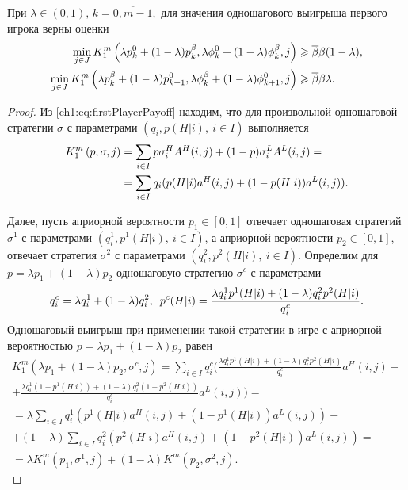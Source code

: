 {\begin{proposition}
  \label{ch1:prop:first:combination:step}
  При $\lambda \in (0, 1), \, k = \overline{0, m-1},$ для значения одношагового выигрыша первого игрока верны оценки
  \begin{align*}
    \min_{j \in J}
    \firstPlayerPayoff{1}{%
    \lambda \pEven + (1-\lambda) \pOdd}{%
    \lambda \fEven + (1-\lambda) \fOdd}{%
    j}
    &\geq \DCo \Co (1-\lambda), \\
    \min_{j \in J}
    \firstPlayerPayoff{1}{%
    \lambda \pOdd + (1-\lambda) \pEven[k+1]}{%
    \lambda \fOdd + (1-\lambda) \fEven[k+1]}{%
    j}
    &\geq \DCo \Co \lambda.
  \end{align*}
\end{proposition}
\begin{proof}
  Из \eqref{ch1:eq:firstPlayerPayoff} находим, что для произвольной одношаговой стратегии $\sigma$ с параметрами $(q_i, p(H|i),\ i \in I)$ выполняется
  \begin{align*}
    K_{1}^m\left({p}, {\sigma}, {j}\right) 
    &= \sum_{i \in I} p \sigma^H_i A^H(i, j) + (1-p) \sigma^L_i A^L(i, j) = \\
    &= \sum_{i \in I} q_i (p(H | i) a^H(i, j) + (1-p(H | i)) a^L(i, j)).
  \end{align*}
  
  Далее, пусть априорной вероятности $p_1 \in [0, 1]$ отвечает одношаговая стратегий $\sigma^1$ с параметрами $(q^1_i, p^1(H|i),\ i \in I)$, а априорной вероятности $p_2 \in [0, 1]$, отвечает стратегия $\sigma^2$ с параметрами $(q^2_i, p^2(H|i),\ i \in I)$.
  Определим для $p = \lambda p_1 + (1-\lambda) p_2$ одношаговую стратегию $\sigma^c$ с параметрами
  \begin{equation*}
    q^c_i = \lambda q^1_i + (1-\lambda) q^2_i, \enskip
    p^c(H|i) = \frac{\lambda q^1_i p^1(H|i) + (1-\lambda) q^2_i p^2(H|i)}{q^c_i}.
  \end{equation*}
  Одношаговый выигрыш при применении такой стратегии в игре с априорной вероятностью $p = \lambda p_1 + (1-\lambda) p_2$ равен
  \begin{multline*}
    K^m_1(\lambda p_1 + (1-\lambda) p_2, \sigma^c, j) = \sum_{i \in I} q^c_i \biggl(
     \frac{\lambda q^1_i p^1(H|i) + (1-\lambda) q^2_i p^2(H|i)}{q^c_i} a^H(i, j) + \\
    + \frac{\lambda q^1_i (1-p^1(H|i)) + (1-\lambda) q^2_i (1-p^2(H|i))}{q^c_i} a^L(i, j)
     \biggr) = \\
    = \lambda \sum_{i \in I} q^1_i (p^1(H|i) a^H(i, j) + (1-p^1(H|i)) a^L(i, j)) + \\
    + (1-\lambda) \sum_{i \in I} q^2_i (p^2(H|i) a^H(i, j) + (1-p^2(H|i)) a^L(i, j)) = \\
    = \lambda K^m_1(p_1, \sigma^1, j) + (1-\lambda) K^m(p_2, \sigma^2, j).
  \end{multline*}
  

\end{proof}}
